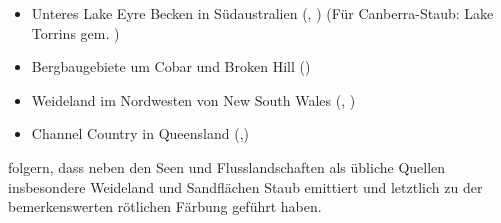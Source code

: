 \documentclass[12pt,a4paper,onecolumn,draft]{scrartcl}
\begin{document}
\begin{itemize}
\item Unteres Lake Eyre Becken in Südaustralien (\cite{Leys.2011}, \cite{Leys.2009}) (Für Canberra-Staub: Lake Torrins gem. \cite{Deckker.2014})
\item Bergbaugebiete um Cobar und Broken Hill  (\cite{Leys.2011})
\item Weideland im Nordwesten von New South Wales (\cite{Leys.2011}, \cite{Leys.2009})
\item Channel Country in Queensland (\cite{Leys.2011},\cite{Leys.2009})
\end{itemize}
\citet{Leys.2011} folgern, dass neben den Seen und Flusslandschaften als übliche Quellen insbesondere Weideland und Sandflächen Staub emittiert und letztlich zu der bemerkenswerten rötlichen Färbung geführt haben.
\end{document}
